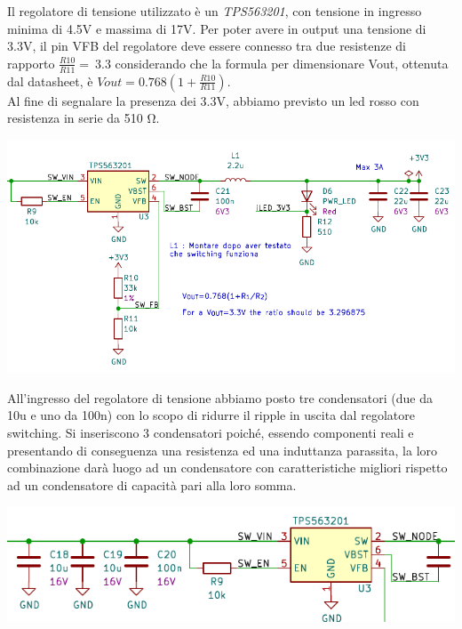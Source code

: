 Il regolatore di tensione utilizzato è un \emph{TPS563201}, con tensione
in ingresso minima di 4.5V e massima di 17V. Per poter avere in output
una tensione di 3.3V, il pin VFB del regolatore deve essere connesso tra
due resistenze di rapporto \(\frac{R10}{R11} = \ 3.3\) considerando che
la formula per dimensionare Vout, ottenuta dal datasheet, è
\(Vout = 0.768(1 + \frac{R10}{R11})\).\\
Al fine di segnalare la presenza dei 3.3V, abbiamo previsto un led rosso
con resistenza in serie da 510 Ω.

\begin{center}
\includegraphics[scale=0.7]{figures/image57.png}
\captionsetup{type=figure}
\end{center}

All'ingresso del regolatore di tensione abbiamo posto tre condensatori
(due da 10u e uno da 100n) con lo scopo di ridurre il ripple in uscita
dal regolatore switching. Si inseriscono 3 condensatori poiché, essendo
componenti reali e presentando di conseguenza una resistenza ed una
induttanza parassita, la loro combinazione darà luogo ad un condensatore
con caratteristiche migliori rispetto ad un condensatore di capacità
pari alla loro somma.

\begin{center}
\includegraphics[scale=0.8]{figures/image71.png}
\captionsetup{type=figure}
\end{center}

